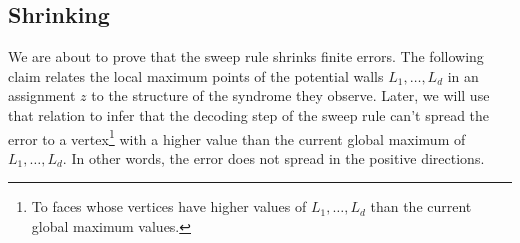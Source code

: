 \subsection{Shrinking}
\label{subsection:shrink}
We are about to prove that the sweep rule shrinks finite errors.  
The following claim relates the local maximum points of the potential walls $L_{1}, \ldots, L_{d}$ in an assignment $z$ to the structure of the syndrome they observe. Later, we will use that relation to infer that the decoding step of the sweep rule can't spread the error to a vertex\footnote{To faces whose vertices have higher values of $L_{1}, \ldots, L_{d}$ than the current global maximum values.} with a higher value than the current global maximum of $L_{1}, \ldots, L_{d}$. In other words, the error does not spread in the positive directions.

